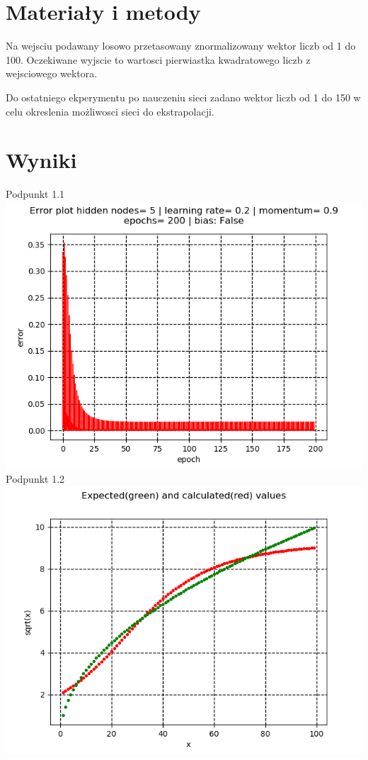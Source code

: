 \documentclass{classrep}
\begin{document}
\section{Materiały i metody}
{Na wejsciu podawany losowo przetasowany znormalizowany wektor liczb od 1 do 100.
Oczekiwane wyjscie to wartosci pierwiastka kwadratowego liczb z wejsciowego wektora.

Do ostatniego ekperymentu po nauczeniu sieci zadano wektor liczb od 1 do 150 w celu okreslenia możliwosci sieci do ekstrapolacji.
}
\section{Wyniki}
{
Podpunkt 1.1\\
\includegraphics[scale=0.8]{imgs/1_1.png}\\
Podpunkt 1.2\\
\includegraphics[scale=0.8]{imgs/1_2.png}\\
}  
\end{document}
